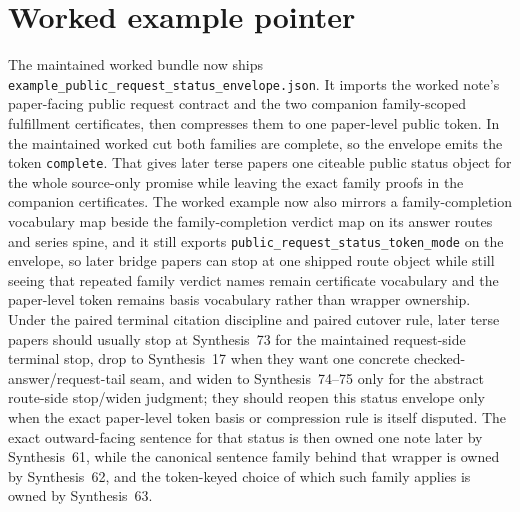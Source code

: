 \documentclass[11pt]{article}
\begin{document}
\section{Worked example pointer}
The maintained worked bundle now ships \nolinkurl{example_public_request_status_envelope.json}.\cite{series:workedexample}
It imports the worked note's paper-facing public request contract and the two companion family-scoped fulfillment certificates, then compresses them to one paper-level public token.
In the maintained worked cut both families are complete, so the envelope emits the token \texttt{complete}.
That gives later terse papers one citeable public status object for the whole source-only promise while leaving the exact family proofs in the companion certificates. The worked example now also mirrors a family-completion vocabulary map beside the family-completion verdict map on its answer routes and series spine, and it still exports \texttt{public\_request\_status\_token\_mode} on the envelope, so later bridge papers can stop at one shipped route object while still seeing that repeated family verdict names remain certificate vocabulary and the paper-level token remains basis vocabulary rather than wrapper ownership. Under the paired terminal citation discipline and paired cutover rule, later terse papers should usually stop at Synthesis~73 for the maintained request-side terminal stop, drop to Synthesis~17 when they want one concrete checked-answer/request-tail seam, and widen to Synthesis~74--75 only for the abstract route-side stop/widen judgment; they should reopen this status envelope only when the exact paper-level token basis or compression rule is itself disputed. The exact outward-facing sentence for that status is then owned one note later by Synthesis~61, while the canonical sentence family behind that wrapper is owned by Synthesis~62, and the token-keyed choice of which such family applies is owned by Synthesis~63.\cite{series:publicrequestnotices,series:publicrequestnoticenormalforms,series:publicrequestnoticeselections,series:requestsideterminalcitationnormalform,series:pairedterminalcitationdiscipline,series:pairedterminalcutoverrules}
\end{document}
